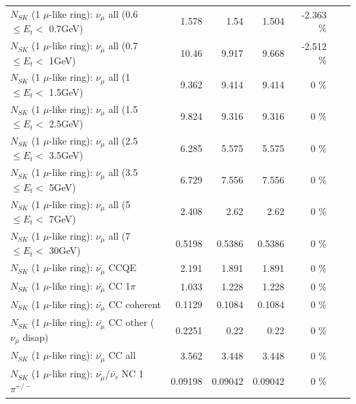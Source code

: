 \begin{table}
\begin{tabular}{| l | r | r | r  r | r  r |}
       $N_{SK}$ (1 $\mu$-like ring): $\nu_{\mu}$ all (0.6 $\leq E_{t} <$ 0.7GeV) &           1.578 &           1.54 &          1.504 &  -2.363 \%  & & \\
         $N_{SK}$ (1 $\mu$-like ring): $\nu_{\mu}$ all (0.7 $\leq E_{t} <$ 1GeV) &           10.46 &          9.917 &          9.668 &  -2.512 \%  & & \\
         $N_{SK}$ (1 $\mu$-like ring): $\nu_{\mu}$ all (1 $\leq E_{t} <$ 1.5GeV) &           9.362 &          9.414 &          9.414 &       0 \%  & & \\
       $N_{SK}$ (1 $\mu$-like ring): $\nu_{\mu}$ all (1.5 $\leq E_{t} <$ 2.5GeV) &           9.824 &          9.316 &          9.316 &       0 \%  & & \\
       $N_{SK}$ (1 $\mu$-like ring): $\nu_{\mu}$ all (2.5 $\leq E_{t} <$ 3.5GeV) &           6.285 &          5.575 &          5.575 &       0 \%  & & \\
         $N_{SK}$ (1 $\mu$-like ring): $\nu_{\mu}$ all (3.5 $\leq E_{t} <$ 5GeV) &           6.729 &          7.556 &          7.556 &       0 \%  & & \\
           $N_{SK}$ (1 $\mu$-like ring): $\nu_{\mu}$ all (5 $\leq E_{t} <$ 7GeV) &           2.408 &           2.62 &           2.62 &       0 \%  & & \\
          $N_{SK}$ (1 $\mu$-like ring): $\nu_{\mu}$ all (7 $\leq E_{t} <$ 30GeV) &          0.5198 &         0.5386 &         0.5386 &       0 \%  & & \\
\hline
\hline
\hline
                              $N_{SK}$ (1 $\mu$-like ring): $\bar{\nu_\mu}$ CCQE &           2.191 &          1.891 &          1.891 &       0 \%  & & \\
                         $N_{SK}$ (1 $\mu$-like ring): $\bar{\nu_\mu}$ CC 1$\pi$ &           1.033 &          1.228 &          1.228 &       0 \%  & & \\
                       $N_{SK}$ (1 $\mu$-like ring): $\bar{\nu_\mu}$ CC coherent &          0.1129 &         0.1084 &         0.1084 &       0 \%  & & \\
        $N_{SK}$ (1 $\mu$-like ring): $\bar{\nu_\mu}$ CC other ($\nu_\mu$ disap) &          0.2251 &           0.22 &           0.22 &       0 \%  & & \\
                          $N_{SK}$ (1 $\mu$-like ring): $\bar{\nu_{\mu}}$ CC all &           3.562 &          3.448 &          3.448 &       0 \%  & & \\
\hline
  $N_{SK}$ (1 $\mu$-like ring): $\bar{\nu_\mu}$/$\bar{\nu_\tau}$ NC 1$\pi^{+/-}$ &         0.09198 &        0.09042 &        0.09042 &       0 \%  & & \\

\end{tabular}
\end{table}
